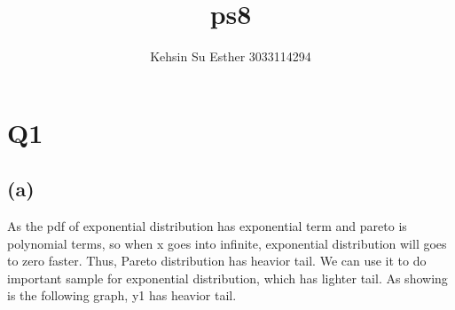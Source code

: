 \documentclass{article}\usepackage[]{graphicx}\usepackage[]{color}
\title {ps8}
\author {Kehsin Su Esther 3033114294}
\begin{document}
 
\maketitle

\section{Q1}
\subsection{(a)}
As the pdf of exponential distribution has exponential term and pareto is polynomial terms, so when x goes into infinite, exponential distribution will goes to zero faster. Thus, Pareto distribution has heavior tail.
We can use it to do important sample for exponential distribution, which has lighter tail.
As showing is the following graph, y1 has heavior tail.
\end{document}
